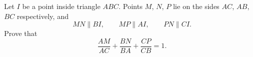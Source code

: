 Let $I$ be a point inside triangle $ABC$. Points $M$, $N$, $P$ lie on the sides $AC$, $AB$, $BC$ respectively, and
\[
MN\parallel BI,\qquad MP\parallel AI,\qquad PN\parallel CI .
\]
Prove that
\[
\dfrac{AM}{AC}+\dfrac{BN}{BA}+\dfrac{CP}{CB}=1 .
\]
